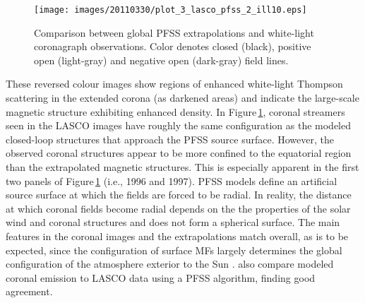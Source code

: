 \documentclass[namedreferences]{solarphysics}
\newcommand{\degr}{\ensuremath{^\circ}}
\begin{document}
\begin{article}
\begin{landscape}
\begin{figure}
\begin{center}
\texttt{[image: images/20110330/plot\_3\_lasco\_pfss\_2\_ill10.eps]}
\end{center}
\caption{Comparison between global PFSS extrapolations and white-light coronagraph observations. Color denotes closed (black), positive open (light-gray) and negative open (dark-gray) field lines.}\label{plot_3_lasco_pfss}
\end{figure}
\end{landscape}


These reversed colour images show regions of enhanced white-light Thompson scattering in the extended corona (as darkened areas) and indicate the large-scale magnetic structure exhibiting enhanced density. In Figure\,\ref{plot_3_lasco_pfss}, coronal streamers seen in the LASCO images have roughly the same configuration as the modeled closed-loop structures that approach the PFSS source surface. However, the observed coronal structures appear to be more confined to the equatorial region than the extrapolated magnetic structures. This is especially apparent in the first two panels of Figure\,\ref{plot_3_lasco_pfss} (i.e., 1996 and 1997). PFSS models define an artificial source surface at which the fields are forced to be radial. In reality, the distance at which coronal fields become radial depends on the the properties of the solar wind and coronal structures and does not form a spherical surface.  %
The main features in the coronal images and the extrapolations match overall, as is to be expected, since the configuration of surface MFs largely determines the global configuration of the atmosphere exterior to the Sun \citep{Schrijver:2003}. \citet{Wang:2009} also compare modeled coronal emission to LASCO data using a PFSS algorithm, finding good agreement.



\end{article}
\end{document}

